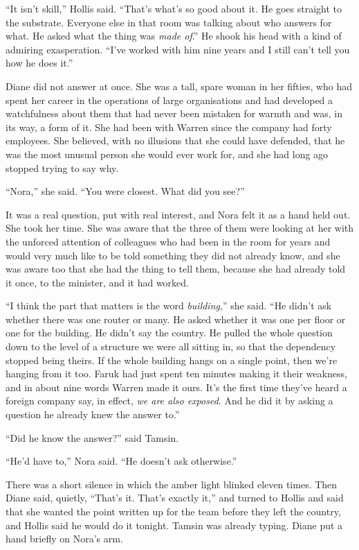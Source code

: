 ``It isn't skill,'' Hollis said. ``That's what's so good about it. He goes straight to the substrate. Everyone else in that room was talking about who answers for what. He asked what the thing was \emph{made of}.'' He shook his head with a kind of admiring exasperation. ``I've worked with him nine years and I still can't tell you how he does it.''

Diane did not answer at once. She was a tall, spare woman in her fifties, who had spent her career in the operations of large organisations and had developed a watchfulness about them that had never been mistaken for warmth and was, in its way, a form of it. She had been with Warren since the company had forty employees. She believed, with no illusions that she could have defended, that he was the most unusual person she would ever work for, and she had long ago stopped trying to say why.

``Nora,'' she said. ``You were closest. What did you see?''

It was a real question, put with real interest, and Nora felt it as a hand held out. She took her time. She was aware that the three of them were looking at her with the unforced attention of colleagues who had been in the room for years and would very much like to be told something they did not already know, and she was aware too that she had the thing to tell them, because she had already told it once, to the minister, and it had worked.

``I think the part that matters is the word \emph{building},'' she said. ``He didn't ask whether there was one router or many. He asked whether it was one per floor or one for the building. He didn't say the country. He pulled the whole question down to the level of a structure we were all sitting in, so that the dependency stopped being theirs. If the whole building hangs on a single point, then we're hanging from it too. Faruk had just spent ten minutes making it their weakness, and in about nine words Warren made it ours. It's the first time they've heard a foreign company say, in effect, \emph{we are also exposed}. And he did it by asking a question he already knew the answer to.''

``Did he know the answer?'' said Tamsin.

``He'd have to,'' Nora said. ``He doesn't ask otherwise.''

There was a short silence in which the amber light blinked eleven times. Then Diane said, quietly, ``That's it. That's exactly it,'' and turned to Hollis and said that she wanted the point written up for the team before they left the country, and Hollis said he would do it tonight. Tamsin was already typing. Diane put a hand briefly on Nora's arm.

